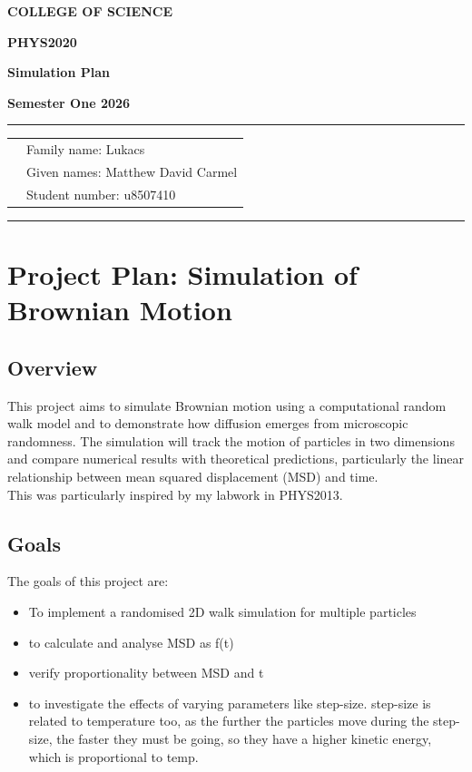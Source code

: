 \documentclass[12pt]{article}
\begin{document}
\begin{center}
    {\bf COLLEGE OF SCIENCE}
\end{center}
\centerline{\large\bf PHYS2020}     
\vspace{0.1cm}
\centerline{\large\bf Simulation Plan} 
\vspace{0.1cm}
\centerline{\large\bf Semester One 2026}
\vspace{3mm}
\hrule
\vspace{3mm}

\begin{tabular}{rl}
    & Family name: Lukacs \\[6pt]
    & Given names: Matthew David Carmel\\[6pt]
    & Student number: u8507410\\[6pt]
\end{tabular}

\vspace{4mm}
\hrule
\vspace{4mm}



\section{Project Plan: Simulation of Brownian Motion}

\subsection{Overview}
This project aims to simulate Brownian motion using a computational random walk model and to demonstrate how diffusion emerges from microscopic randomness. The simulation will track the motion of particles in two dimensions and compare numerical results with theoretical predictions, particularly the linear relationship between mean squared displacement (MSD) and time.\\

This was particularly inspired by my labwork in PHYS2013.

\subsection{Goals}
The goals of this project are:
\begin{itemize}
    \item To implement a randomised 2D walk simulation for multiple particles
    \item to calculate and analyse MSD as f(t)
    \item verify proportionality between MSD and t
    \item to investigate the effects of varying parameters like step-size. step-size is related to temperature too, as the further the particles move during the step-size, the faster they must be going, so they have a higher kinetic energy, which is proportional to temp.
\end{itemize}
\end{document}
